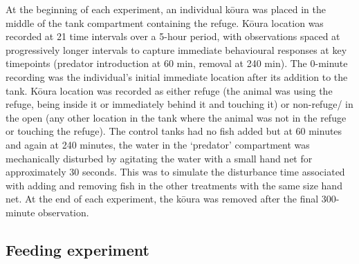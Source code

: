 \documentclass[
  12pt,
  a4paper,
  oneside]{scrbook}
\begin{document}
At the beginning of each experiment, an individual kōura was placed in
the middle of the tank compartment containing the refuge. Kōura location
was recorded at 21 time intervals over a 5-hour period, with
observations spaced at progressively longer intervals to capture
immediate behavioural responses at key timepoints (predator introduction
at 60 min, removal at 240 min). The 0-minute recording was the
individual's initial immediate location after its addition to the tank.
Kōura location was recorded as either refuge (the animal was using the
refuge, being inside it or immediately behind it and touching it) or
non-refuge/ in the open (any other location in the tank where the animal
was not in the refuge or touching the refuge). The control tanks had no
fish added but at 60 minutes and again at 240 minutes, the water in the
`predator' compartment was mechanically disturbed by agitating the water
with a small hand net for approximately 30 seconds. This was to simulate
the disturbance time associated with adding and removing fish in the
other treatments with the same size hand net. At the end of each
experiment, the kōura was removed after the final 300-minute
observation.

\subsection{Feeding experiment}\label{feeding-experiment}
\end{document}
